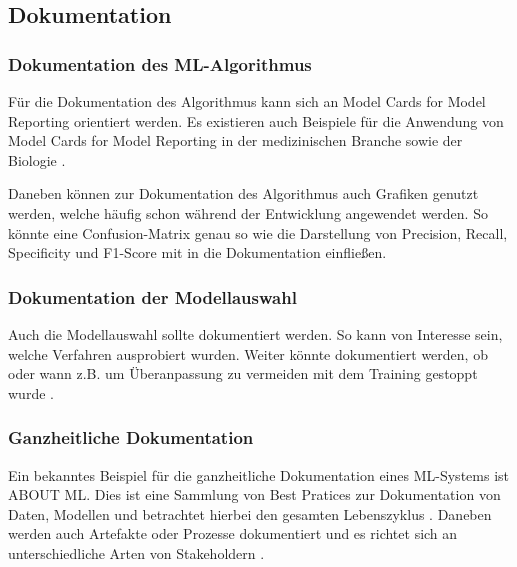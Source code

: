 \subsection{Dokumentation}
\subsubsection{Dokumentation des ML-Algorithmus}
Für die Dokumentation des Algorithmus kann sich an Model Cards for Model Reporting orientiert werden.
Es existieren auch Beispiele für die Anwendung von Model Cards for Model Reporting in der medizinischen Branche \cite{sendak2020human} sowie der Biologie \cite{grasso2020applying}.

Daneben können zur Dokumentation des Algorithmus auch Grafiken genutzt werden, welche häufig schon während der Entwicklung angewendet werden. So könnte eine Confusion-Matrix \cite{hasib2022machine} genau so wie die Darstellung von Precision, Recall, Specificity und F1-Score \cite{huvc2021anomaly} mit in die Dokumentation einfließen.

\subsubsection{Dokumentation der Modellauswahl}
Auch die Modellauswahl sollte dokumentiert werden. So kann von Interesse sein, welche Verfahren ausprobiert wurden. Weiter könnte dokumentiert werden, ob oder wann z.B. um Überanpassung zu vermeiden mit dem Training gestoppt wurde \cite{de2018algorithmic}.

\subsubsection{Ganzheitliche Dokumentation}
Ein bekanntes Beispiel für die ganzheitliche Dokumentation eines ML-Systems ist ABOUT ML. Dies ist eine Sammlung von Best Pratices zur Dokumentation von Daten, Modellen und betrachtet hierbei den gesamten Lebenszyklus \cite{vaughan2020human, raji2019ml}. Daneben werden auch Artefakte oder Prozesse dokumentiert und es richtet sich an unterschiedliche Arten von Stakeholdern \cite{raji2019ml}.

